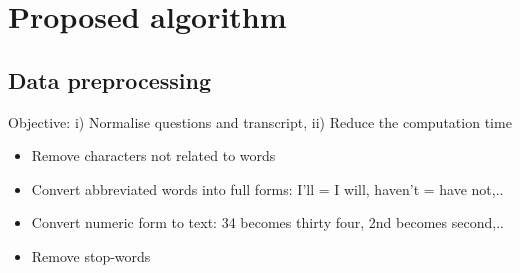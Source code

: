\documentclass[10pt,a4paper]{article}
\begin{document}
\section{Proposed algorithm}

\subsection{Data preprocessing}
Objective: i) Normalise questions and transcript, ii) Reduce the computation time
	
\begin{itemize}
\item {Remove characters not related to words}
\item {Convert abbreviated words into full forms: I'll = I will, haven't = have not,..}
\item {Convert numeric form to text: 34 becomes thirty four, 2nd becomes second,..}
\item {Remove stop-words}
\end{itemize}
\end{document}
